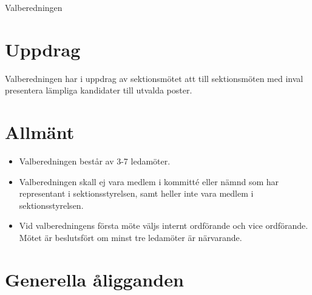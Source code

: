 \documentclass[a4paper]{article}
\begin{document}
\renewcommand{\forening}{Valberedningen} %

\begin{foreningenv}{\forening{}} %
    \section{Uppdrag}
    Valberedningen har i uppdrag av sektionsmötet att till sektionsmöten med inval presentera lämpliga kandidater till utvalda poster.
    
    \section{Allmänt}
    \begin{itemize}
        \item Valberedningen består av 3-7 ledamöter.
        \item Valberedningen skall ej vara medlem i kommitté eller nämnd som har representant i sektionsstyrelsen, samt heller inte vara medlem i sektionsstyrelsen.
        \item Vid valberedningens första möte väljs internt ordförande och vice ordförande. Mötet är beslutsfört om minst tre ledamöter är närvarande.
    \end{itemize}
    
    \section{Generella åligganden}
    \aliggsektfunkt{}
    

\end{foreningenv}
\end{document}
